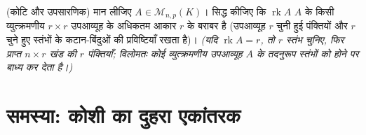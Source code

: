 \begin{exercise}[$\star\star\star$]\label{exo:b1:det:12}
(कोटि और उपसारणिक) मान लीजिए $A \in \mathcal{M}_{n,p}(K)$। सिद्ध कीजिए कि
$\operatorname{rk} A$ $A$ के किसी व्युत्क्रमणीय $r \times r$ उपआव्यूह के
अधिकतम आकार $r$ के बराबर है (उपआव्यूह $r$ चुनी हुई पंक्तियों और $r$ चुने हुए
स्तंभों के कटान-बिंदुओं की प्रविष्टियाँ रखता है)। \emph{(यदि
$\operatorname{rk} A = r$, तो $r$  स्तंभ चुनिए, फिर प्राप्त $n
\times r$ खंड की $r$  पंक्तियाँ; विलोमतः कोई व्युत्क्रमणीय उपआव्यूह
$A$ के तदनुरूप स्तंभों को  होने पर बाध्य कर देता है।)}
\end{exercise}

\section{समस्या: कोशी का दुहरा एकांतरक}

